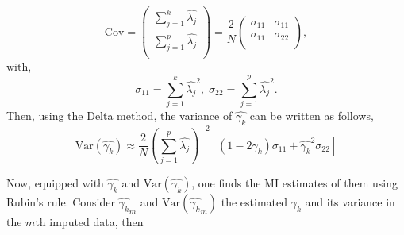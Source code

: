\documentclass[11pt,a5paper,twoside]{book}
\begin{document}
\begin{equation}
\label{cov_delta1}
\mathrm{Cov} = \left(
\begin{array}{c}
\sum_{j=1}^k \widehat{\lambda_j} \\
\sum_{j=1}^p \widehat{\lambda_j}\\
\end{array} \right) = \frac{2}{N}\left(
\begin{array}{cc}
\sigma_{11} & \sigma_{11}\\
\sigma_{11}& \sigma_{22}\\
\end{array}
\right),
\end{equation}
with,
\begin{equation}
\label{cov_delta2}
\sigma_{11}=\sum_{j=1}^k \widehat{\lambda_j}^2,\;\sigma_{22}= \sum_{j=1}^p \widehat{\lambda_j}^2.
\end{equation}
Then, using the Delta method, the variance of $\widehat{\gamma_k}$ can be written as follows,
\begin{equation}
\label{var_gamma_k}
\mathrm{Var}(\widehat{\gamma_k})\approx \frac{2}{N}\left( \sum_{j=1}^p \widehat{\lambda_j} \right)^{-2} \left[(1- 2\widehat{\gamma_k}) \sigma_{11} + \widehat{\gamma_k}^2 \sigma_{22} \right]
\end{equation}

Now, equipped with $\widehat{\gamma_k}$ and $\mathrm{Var}(\widehat{\gamma_k})$, one finds the MI estimates of them using Rubin's rule. Consider $\widehat{\gamma_k}_m$ and $\mathrm{Var}(\widehat{\gamma_k}_m)$ the estimated $\gamma_k$ and its variance in the $m$th imputed data, then
\end{document}
